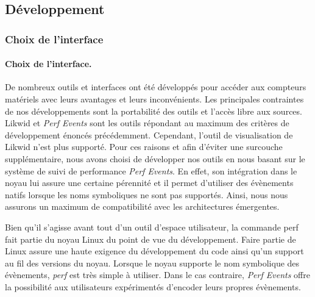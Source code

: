    

\subsection{Développement}

    \subsubsection{Choix de l'interface}
    
    
        \paragraph{Choix de l'interface.}  
        
            De nombreux outils et interfaces ont été développés pour accéder aux compteurs matériels avec leurs avantages et leurs inconvénients. Les principales contraintes de nos développements sont la portabilité des outils et l'accès libre aux sources. Likwid et \textit{Perf Events} sont les outils répondant au maximum des critères de développement énoncés précédemment. Cependant, l'outil de visualisation de Likwid n'est plus supporté. Pour ces raisons et afin d'éviter une surcouche supplémentaire, nous avons choisi de développer nos outils en nous basant sur le système de suivi de performance \textit{Perf Events}. En effet, son intégration dans le noyau lui assure une certaine pérennité et il permet d'utiliser des évènements natifs lorsque les noms symboliques ne sont pas supportés. Ainsi, nous nous assurons un maximum de compatibilité avec les architectures émergentes.
            
            Bien qu'il s'agisse avant tout d'un outil d'espace utilisateur, la commande perf fait partie du noyau Linux du point de vue du développement. Faire partie de Linux assure une haute exigence du développement du code ainsi qu'un support au fil des versions du noyau. Lorsque le noyau supporte le nom symbolique des évènements, \textit{perf} est très simple à utiliser. Dans le cas contraire, \textit{Perf Events} offre la possibilité aux utilisateurs expérimentés d'encoder leurs propres évènements.
            
